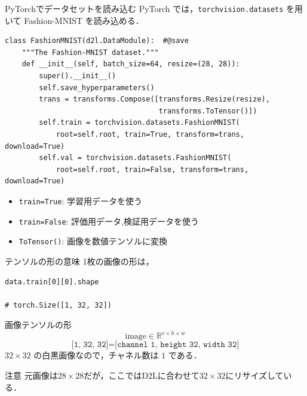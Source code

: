 \documentclass[dvipdfmx,uplatex,11pt]{beamer}
\newcommand{\shape}[1]{\texttt{#1}}
\begin{document}
\begin{frame}[fragile]{PyTorchでデータセットを読み込む}
PyTorch では，\texttt{torchvision.datasets} を用いて
Fashion-MNIST を読み込める．
\begin{lstlisting}
class FashionMNIST(d2l.DataModule):  #@save
    """The Fashion-MNIST dataset."""
    def __init__(self, batch_size=64, resize=(28, 28)):
        super().__init__()
        self.save_hyperparameters()
        trans = transforms.Compose([transforms.Resize(resize),
                                    transforms.ToTensor()])
        self.train = torchvision.datasets.FashionMNIST(
            root=self.root, train=True, transform=trans, download=True)
        self.val = torchvision.datasets.FashionMNIST(
            root=self.root, train=False, transform=trans, download=True)

\end{lstlisting}
\begin{itemize}
  \item \texttt{train=True}: 学習用データを使う
  \item \texttt{train=False}: 評価用データ,検証用データを使う
  \item \texttt{ToTensor()}: 画像を数値テンソルに変換
\end{itemize}
\end{frame}

\begin{frame}[fragile]{テンソルの形の意味}
1枚の画像の形は，
\begin{lstlisting}
data.train[0][0].shape

# torch.Size([1, 32, 32])
\end{lstlisting}

\begin{d2lbox}{画像テンソルの形}
\[
\text{image} \in \mathbb{R}^{c \times h \times w}
\]
\[
\shape{[1, 32, 32]}
=
\texttt{[channel 1, height 32, width 32]}
\]
$32 \times 32$ の白黒画像なので，チャネル数は $1$ である．
\end{d2lbox}
\begin{alertblock}{注意}
元画像は$28\times 28$だが，ここではD2Lに合わせて$32\times32$にリサイズしている．
\end{alertblock}

\end{frame}
\end{document}
